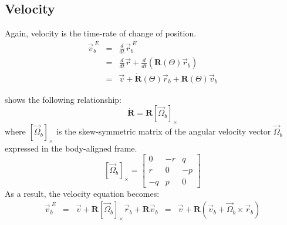 \subsection{Velocity}
Again, velocity is the time-rate of change of position.
\begin{equation} \nonumber
    \begin{aligned}
        \vec{v}^{\ E}_b & = & \frac{d}{dt} \vec{r}^{\ E}_b                                                    \\
                        & = & \frac{d}{dt} \vec{r} + \frac{d}{dt} \left( \mathbf{R}(\Theta) \vec{r}_b \right) \\
                        & = & \vec{v} + \dot{\mathbf{R}}(\Theta) \vec{r}_b + \mathbf{R}(\Theta) \vec{v}_b
    \end{aligned}
\end{equation}

\cite{zhao_dRdt} shows the following relationship:
\begin{equation} \nonumber
    \dot{\mathbf{R}} = \mathbf{R} [\vec{\Omega}_b]_\times
\end{equation}
where \( [\vec{\Omega}_b]_\times \) is the skew-symmetric matrix of the angular velocity vector \( \vec{\Omega}_b \) expressed in the body-aligned frame.
\begin{equation} \nonumber
    [\vec{\Omega}_b]_\times = \begin{bmatrix}
        0  & -r & q  \\
        r  & 0  & -p \\
        -q & p  & 0
    \end{bmatrix}
\end{equation}
As a result, the velocity equation becomes:
\begin{equation} \nonumber
    \begin{aligned}
        \vec{v}^{\ E}_b & = & \vec{v} + \mathbf{R} [\vec{\Omega}_b]_\times \vec{r}_b + \mathbf{R} \vec{v}_b
                        & = & \vec{v} + \mathbf{R} \left(\vec{v}_b + \vec{\Omega}_b \times \vec{r}_b \right)
    \end{aligned}
\end{equation}


